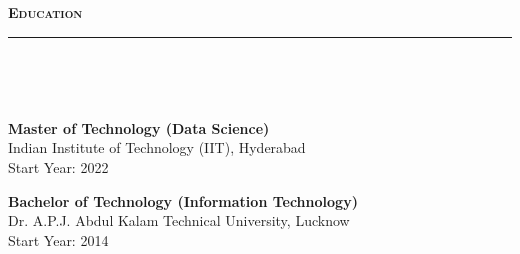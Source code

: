 \documentclass[a4paper,10pt]{article}
\newcommand{\isep}{-2 pt}
\newcommand{\lsep}{-0.5cm}
\newcommand{\resheading}[1]{{\small
        {
            \begin{minipage}
                {0.992\textwidth}\textbf{{\textsc{#1 \vphantom{p\^{E}} }}}
                \\[-0.3cm]
                \hrule
            \end{minipage}
            \\[-0.5cm]
        }
 }}
\begin{document}
\begin{itemize}
\end{itemize}
\vspace{4pt}
\noindent
\resheading{\textbf{\large Education}}\\[\lsep]
\vspace{0pt}


\begin{multicols}{2}

    \begin{list}{}{\setlength{\leftmargin}{0.5cm} \setlength{\rightmargin}{0cm} \setlength{\itemindent}{0cm}}
        \item 
        \textbf{Master of Technology (Data Science)} \\
        Indian Institute of Technology (IIT), Hyderabad \\
        Start Year: 2022
    \end{list}

    \columnbreak

    \begin{list}{}{\setlength{\leftmargin}{0.5cm} \setlength{\rightmargin}{0cm} \setlength{\itemindent}{0cm}}
        \item 
        \textbf{Bachelor of Technology (Information Technology)} \\
        Dr. A.P.J. Abdul Kalam Technical University, Lucknow \\
        Start Year: 2014
    \end{list}

\end{multicols}
\end{document}
